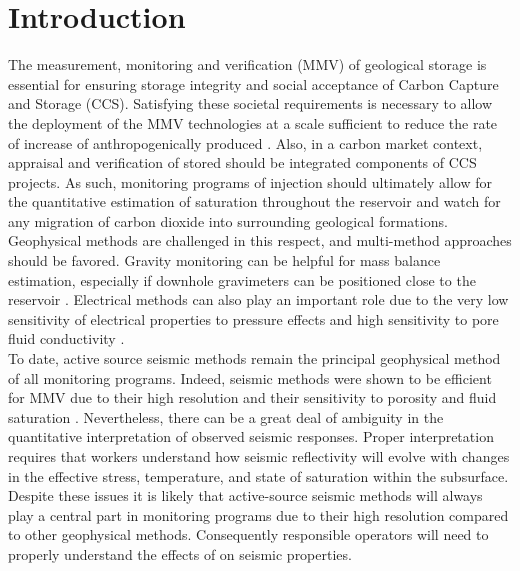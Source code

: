 \section{Introduction}
The measurement, monitoring and verification (MMV) of geological 
storage is essential for ensuring storage integrity and social acceptance of
Carbon Capture and Storage (CCS). Satisfying these societal requirements is
necessary to allow the deployment of the MMV technologies at a scale sufficient
to reduce the rate of increase of anthropogenically produced . Also, in
a carbon market context, appraisal and verification of stored  should be
integrated components of CCS projects. As such, monitoring programs of 
injection should ultimately allow for the quantitative estimation of 
saturation throughout the reservoir and watch for any migration of carbon
dioxide into surrounding geological formations. Geophysical methods are
challenged in this respect, and multi-method approaches should be favored.
Gravity monitoring can be helpful for mass balance estimation, especially if
downhole gravimeters can be positioned close to the reservoir \citep{dodds13}.
Electrical methods can also play an important role due to the very low
sensitivity of electrical properties to pressure effects and high sensitivity to
pore fluid conductivity \citep{schon04,SchmidtHattenberger2013}. \\
To date, active source seismic methods remain the principal geophysical method
of all monitoring programs. Indeed, seismic methods were shown to be efficient
for MMV due to their high resolution and their sensitivity to porosity and fluid
saturation \citep{White2013a,Lumley2010a,Lumley2010,Carcione2006}.
Nevertheless, there can be a great deal of ambiguity in the quantitative
interpretation of observed seismic responses. Proper interpretation requires
that workers understand how seismic reflectivity will evolve with changes in the
effective stress, temperature, and state of saturation within the subsurface.
Despite these issues it is likely that active-source seismic methods will always
play a central part in  monitoring programs due to their high resolution
compared to other geophysical methods. Consequently responsible operators will
need to properly understand the effects of  on seismic properties. \\
